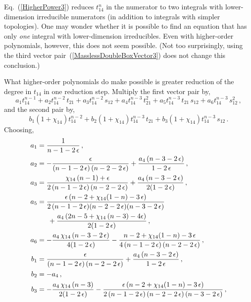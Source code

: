 \documentclass[aps,prd,preprint,groupedaddress,nofootinbib,showpacs,eqsecnum]{revtex4}
\def\Eqn#1{Eq.~(\ref{#1})}
\def\eps{\epsilon}
\begin{document}
\Eqn{HigherPower3} reduces $t_{14}^{n}$ in the numerator to
two integrals with lower-dimension irreducible numerators (in addition
to integrals with simpler topologies).
One may wonder whether it is possible to find an equation that has
only {\it one\/} integral with lower-dimension irreducibles.  Even
with higher-order polynomials, however, this does not seem possible.
(Not too surprisingly, using the third vector 
pair~(\ref{MasslessDoubleBoxVector3}) does not change this conclusion.)

What higher-order polynomials do make possible is greater reduction
of the degree in $t_{14}$ in one reduction step.
Multiply the first vector pair by,
\begin{equation}
a_1 t_{14}^{n-1}
+ a_2 t_{14}^{n-2}\,t_{21}
+ a_3 t_{14}^{n-2}\,s_{12}
+ a_4 t_{14}^{n-3}\,t_{21}^2
+ a_5 t_{14}^{n-3}\,t_{21}\,s_{12}
+ a_6 t_{14}^{n-3}\,s_{12}^2
\,,
\label{ReduceBy2Params1}
\end{equation}
and the second pair by,
\begin{equation}
b_1 (1+\chi_{14})t_{14}^{n-2}
+b_2 (1+\chi_{14})t_{14}^{n-3}\,t_{21}
+b_3 (1+\chi_{14})t_{14}^{n-3}\,s_{12}
\,.
\label{ReduceBy2Params2}
\end{equation}
Choosing,
\begin{equation}
\begin{aligned}
a_{1} &= 
  \frac{1}{n-1-2\,\eps}
  \,,\\
a_{2} &= 
  -\frac{\eps}{(n-1-2\,\eps)\,(n-2-2\,\eps)}
  +\frac{a_{4}\,(n-3-2\,\eps)}{1-2\,\eps}
\,,\\
a_{3} &= 
  \frac{\chi_{14}\,(n-1)+\eps}
       {2\,(n-1-2\,\eps)\,(n-2-2\,\eps)}
  +\frac{a_{4}\,(n-3-2\,\eps)}{2(1-2\,\eps)}
  \,,\\
a_{5} &= 
  \frac{\eps\,(n-2+\chi_{14}(1-n)-3\,\eps)}
       {2\,(n-1-2\,\eps)(n-2-2\,\eps)(n-3-2\,\eps)}
\\&\hphantom{==}
  +\frac{a_{4}\,(2n-5+\chi_{14}\,(n-3)-4\eps)}
        {2(1-2\,\eps)}
\,,\\
a_{6} &= 
  -\frac{a_{4}\,\chi_{14}\,(n-3-2\,\eps)}{4(1-2\,\eps)}
  -\frac{n-2+\chi_{14} (1-n)-3\,\eps}
        {4\,(n-1-2\,\eps)\,(n-2-2\,\eps)}
  \,,\\
b_{1} &= 
  \frac{\eps}{(n-1-2\,\eps)\,(n-2-2\,\eps)}
  +\frac{a_{4}\,(n-3-2\,\eps)}{1-2\,\eps}
  \,,\\
b_{2} &= 
  -a_{4}
  \,,\\
b_{3} &= 
  -\frac{a_{4}\,\chi_{14}\,(n-3)}{2(1-2\,\eps)}
  -\frac{\eps\,(n-2+\chi_{14}(1-n)-3\,\eps)}
        {2\,(n-1-2\,\eps)\,(n-2-2\,\eps)\,(n-3-2\,\eps)}
  \,,
\end{aligned}
\label{ReduceBy2params}
\end{equation}
\end{document}
